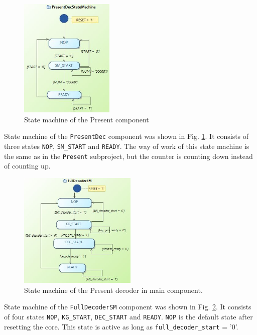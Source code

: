 \documentclass{gajewski}
\begin{document}
\begin{figure}[!ht]%
    \begin{center}
    \includegraphics[width=0.4\textwidth]{img/PresentDecStateMachine.jpg}
    \caption{%
        State machine of the Present component
     }%
    \label{presentDecSM}
    \end{center}
 \end{figure}

State machine of the \texttt{PresentDec} component was shown in Fig. \ref{presentDecSM}. It consists of three states \texttt{NOP}, \texttt{SM\_START} and \texttt{READY}. The way of work of this state machine is the same as in the \texttt{Present} subproject, but the counter is counting down instead of counting up.

\begin{figure}[!ht]%
    \begin{center}
    \includegraphics[width=0.5\textwidth]{img/FullDecoderSM.jpg}
    \caption{%
        State machine of the Present decoder in main component.
     }%
    \label{presentFullDecSM}
    \end{center}
 \end{figure}

State machine of the \texttt{FullDecoderSM} component was shown in Fig. \ref{presentFullDecSM}. It consists of four states \texttt{NOP}, \texttt{KG\_START}, \texttt{DEC\_START} and \texttt{READY}. \texttt{NOP} is the default state after resetting the core. This state is active as long as \texttt{full\_decoder\_start} = '0'.
\end{document}
